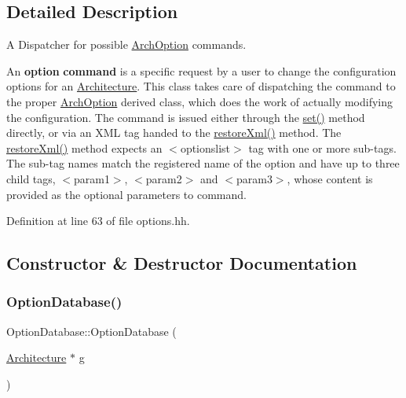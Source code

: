 \subsection{Detailed Description}
A Dispatcher for possible \mbox{\hyperlink{class_arch_option}{Arch\+Option}} commands. 

An {\bfseries{option}} {\bfseries{command}} is a specific request by a user to change the configuration options for an \mbox{\hyperlink{class_architecture}{Architecture}}. This class takes care of dispatching the command to the proper \mbox{\hyperlink{class_arch_option}{Arch\+Option}} derived class, which does the work of actually modifying the configuration. The command is issued either through the \mbox{\hyperlink{class_option_database_aaec7650371cbbb2a17a88393347c9ffc}{set()}} method directly, or via an X\+ML tag handed to the \mbox{\hyperlink{class_option_database_afe0ea0f1c7a7cd2591ac159027082149}{restore\+Xml()}} method. The \mbox{\hyperlink{class_option_database_afe0ea0f1c7a7cd2591ac159027082149}{restore\+Xml()}} method expects an $<$optionslist$>$ tag with one or more sub-\/tags. The sub-\/tag names match the registered name of the option and have up to three child tags, $<$param1$>$, $<$param2$>$ and $<$param3$>$, whose content is provided as the optional parameters to command. 

Definition at line 63 of file options.\+hh.



\subsection{Constructor \& Destructor Documentation}
\mbox{\label{class_option_database_ae5f5fef1aa229bae7fa2188cab44275a}} 
\subsubsection{\texorpdfstring{OptionDatabase()}{OptionDatabase()}}
{\footnotesize\ttfamily Option\+Database\+::\+Option\+Database (\begin{DoxyParamCaption}\item[{\mbox{\hyperlink{class_architecture}{Architecture}} $\ast$}]{g }\end{DoxyParamCaption})}



